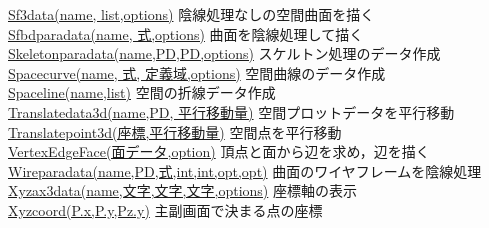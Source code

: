 \documentclass[papersize,a4paper,12pt,uplatex]{jsarticle}
\begin{document}
\begin{tabbing}
\hyperlink{sf3data}{Sf3data(name, list,options)}  \>陰線処理なしの空間曲面を描く\\
\hyperlink{sfbdparadata}{Sfbdparadata(name, 式,options)}  \>曲面を陰線処理して描く\\
\hyperlink{skeletonparadata}{Skeletonparadata(name,PD,PD,options)}  \>スケルトン処理のデータ作成\\
\hyperlink{spacecurve}{Spacecurve(name, 式, 定義域,options)}  \>空間曲線のデータ作成\\
\hyperlink{spaceline}{Spaceline(name,list)}  \>空間の折線データ作成\\
\hyperlink{translatedata3d}{Translatedata3d(name,PD, 平行移動量)}  \>空間プロットデータを平行移動\\
\hyperlink{translatepoint3d}{Translatepoint3d(座標,平行移動量)}  \>空間点を平行移動\\
\hyperlink{vertexedgeface}{VertexEdgeFace(面データ,option)}  \>頂点と面から辺を求め，辺を描く\\
\hyperlink{wireparadata}{Wireparadata(name,PD,式,int,int,opt,opt)}  \>曲面のワイヤフレームを陰線処理\\
\hyperlink{xyzax3data}{Xyzax3data(name,文字,文字,文字,options)}  \>座標軸の表示\\
\hyperlink{xyzcoord}{Xyzcoord(P.x,P.y,Pz.y)}  \>主副画面で決まる点の座標
\end{tabbing}
\end{document}
